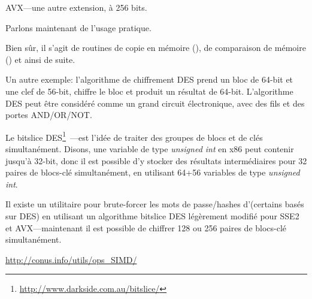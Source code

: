 AVX---une autre extension, à 256 bits.

Parlons maintenant de l'usage pratique.

Bien sûr, il s'agit de routines de copie en mémoire (), de comparaison
de mémoire () et ainsi de suite.


Un autre exemple: l'algorithme de chiffrement DES prend un bloc de 64-bit et une
clef de 56-bit, chiffre le bloc et produit un résultat de 64-bit.
L'algorithme DES peut être considéré comme un grand circuit électronique, avec des
fils et des portes AND/OR/NOT.

\label{bitslicedes}
\newcommand{\URLBS}{\url{http://www.darkside.com.au/bitslice/}}

Le bitslice DES\footnote{\URLBS}~---est l'idée de traiter des groupes de blocs et
de clés simultanément.
Disons, une variable de type \emph{unsigned int} en x86 peut contenir jusqu'à 32-bit,
donc il est possible d'y stocker des résultats intermédiaires pour 32 paires de blocs-clé
simultanément, en utilisant 64+56 variables de type \emph{unsigned int}.

\myindex{\oracle}
Il existe un utilitaire pour brute-forcer les mots de passe/hashes d'\oracle (certains
basés sur DES) en utilisant un algorithme bitslice DES légèrement modifié pour SSE2
et AVX---maintenant il est possible de chiffrer 128 ou 256 paires de blocs-clé simultanément.

\url{http://conus.info/utils/ops_SIMD/}




